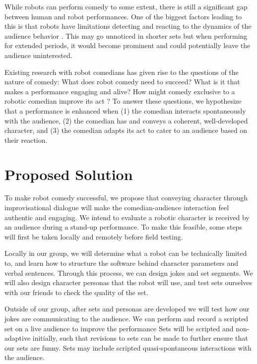 \documentclass[onecolumn, draftclsnofoot,10pt, compsoc]{IEEEtran}
\begin{document}
While robots can perform comedy to some extent, there is still a significant gap between human and robot performances. One of the biggest factors leading to this is that robots have limitations detecting and reacting to the dynamics of the audience behavior {\cite{KatevasRobot:2014}}. This may go unnoticed in shorter sets but when performing for extended periods, it would become prominent and could potentially leave the audience uninterested.

Existing research with robot comedians has given rise to the questions of the nature of comedy: What does robot comedy need to succeed? What is it that makes a performance engaging and alive? How might comedy exclusive to a robotic comedian improve its act {\cite{RobotsMakeThings:2008}}? To answer these questions, we hypothesize that a performance is enhanced when (1) the comedian interacts spontaneously with the audience, (2) the comedian has and conveys a coherent, well-developed character, and (3) the comedian adapts its act to cater to an audience based on their reaction.




\section{Proposed Solution}

To make robot comedy successful, we propose that conveying character through improvisational dialogue will make the comedian-audience interaction feel authentic and engaging. We intend to evaluate a robotic character is received by an audience during a stand-up performance. To make this feasible, some steps will first be taken locally and remotely before field testing.

	Locally in our group, we will determine what a robot can be technically limited to, and learn how to structure the software behind character parameters and verbal sentences. Through this process, we can design jokes and set segments. We will also design character personas that the robot will use, and test sets ourselves with our friends to check the quality of the set.

	Outside of our group, after sets and personas are developed we will test how our jokes are communicating to the audience. We can perform and record a scripted set on a live audience to improve the performance Sets will be scripted and non-adaptive initially, such that revisions to sets can be made to further ensure that our sets are funny. Sets may include scripted quasi-spontaneous interactions with the audience.
\end{document}
